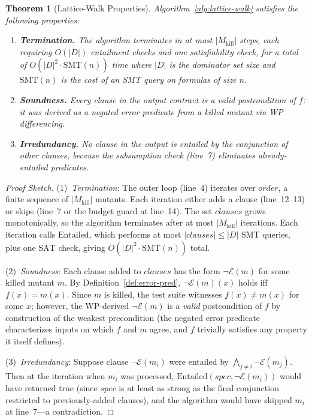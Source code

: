 \documentclass[11pt]{article}
\newtheorem{theorem}{Theorem}
\begin{document}
\begin{theorem}[Lattice-Walk Properties]
\label{thm:walk-properties}
Algorithm~\ref{alg:lattice-walk} satisfies the following properties:
\begin{enumerate}[leftmargin=*]
  \item \textbf{Termination.} The algorithm terminates in at most $|M_{\mathrm{kill}}|$
    steps, each requiring $O(|D|)$ entailment checks and one satisfiability
    check, for a total of $O(|D|^2 \cdot \mathrm{SMT}(n))$ time where $|D|$ is
    the dominator set size and $\mathrm{SMT}(n)$ is the cost of an SMT query on
    formulas of size $n$.
  \item \textbf{Soundness.} Every clause in the output contract is a valid
    postcondition of $f$: it was derived as a negated error predicate from a
    killed mutant via WP differencing.
  \item \textbf{Irredundancy.} No clause in the output is entailed by the
    conjunction of other clauses, because the subsumption check (line~7)
    eliminates already-entailed predicates.
\end{enumerate}
\end{theorem}

\begin{proof}[Proof Sketch]
(1)~\emph{Termination}: The outer loop (line~4) iterates over
$\mathit{order}$, a finite sequence of $|M_{\mathrm{kill}}|$ mutants. Each
iteration either adds a clause (line~12--13) or skips (line~7 or the budget
guard at line~14). The set $\mathit{clauses}$ grows monotonically, so the
algorithm terminates after at most $|M_{\mathrm{kill}}|$ iterations. Each
iteration calls $\mathrm{Entailed}$, which performs at most $|\mathit{clauses}|
\leq |D|$ SMT queries, plus one $\mathrm{SAT}$ check, giving $O(|D|^2 \cdot
\mathrm{SMT}(n))$ total.

(2)~\emph{Soundness}: Each clause added to $\mathit{clauses}$ has the form
$\neg\mathcal{E}(m)$ for some killed mutant $m$. By Definition~\ref{def:error-pred},
$\neg\mathcal{E}(m)(x)$ holds iff $f(x) = m(x)$. Since $m$ is killed, the
test suite witnesses $f(x) \neq m(x)$ for some $x$; however, the WP-derived
$\neg\mathcal{E}(m)$ is a \emph{valid} postcondition of $f$ by construction
of the weakest precondition (the negated error predicate characterizes inputs
on which $f$ and $m$ agree, and $f$ trivially satisfies any property it
itself defines).

(3)~\emph{Irredundancy}: Suppose clause $\neg\mathcal{E}(m_i)$ were entailed
by $\bigwedge_{j \neq i} \neg\mathcal{E}(m_j)$. Then at the iteration when
$m_i$ was processed, $\mathrm{Entailed}(\mathit{spec}, \neg\mathcal{E}(m_i))$
would have returned true (since $\mathit{spec}$ is at least as strong as the
final conjunction restricted to previously-added clauses), and the algorithm
would have skipped $m_i$ at line~7---a contradiction.
\end{proof}
\end{document}
